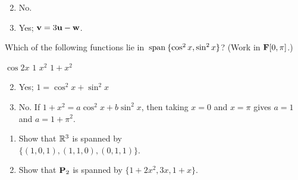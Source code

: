 \begin{multicols}{2}
\begin{ex}
\begin{enumerate}[label={\alph*.}]
\end{enumerate}
\begin{sol}
\begin{enumerate}[label={\alph*.}]
\setcounter{enumi}{1}
\item  No.

\setcounter{enumi}{3}
\item  Yes; $\textbf{v} = 3\textbf{u} - \textbf{w}$.

\end{enumerate}
\end{sol}
\end{ex}

\begin{ex}
Which of the following functions lie in $\thinspace\operatorname{span\medspace}\{\cos^{2}x, \sin^{2} x\}$? (Work in $\textbf{F}[0, \pi]$.)

\begin{exenumerate}
\exitem $\cos 2x$
\exitem $1$
\exitem $x^{2}$
\exitem $1 + x^{2}$
\end{exenumerate}
\begin{sol}
\begin{enumerate}[label={\alph*.}]
\setcounter{enumi}{1}
\item  Yes; $1 = \cos^{2} x + \sin^{2} x$

\setcounter{enumi}{3}
\item  No. If $1 + x^{2} = a \cos^{2} x + b \sin^{2} x$, then taking $x = 0$ and $x = \pi$ gives $a = 1$ and $a = 1 + \pi^{2}$.

\end{enumerate}
\end{sol}
\end{ex}

\begin{ex}
\begin{enumerate}[label={\alph*.}]
\item Show that $\mathbb{R}^3$ is spanned by \\$\{(1, 0, 1), (1, 1, 0), (0, 1, 1)\}$.

\item Show that $\textbf{P}_{2}$ is spanned by $\{1 + 2x^{2}, 3x, 1 + x\}$.


\end{enumerate}
\end{ex}
\end{multicols}
